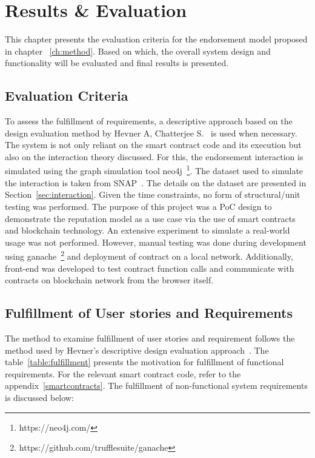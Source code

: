 \chapter{Results \& Evaluation} \label{ch:results}
This chapter presents the evaluation criteria for the endorsement model
proposed in chapter ~\ref{ch:method}. Based on which, the overall system design
and functionality will be evaluated and final results is presented. 

\section{Evaluation Criteria}
To assess the fulfillment of requirements, a descriptive approach based on the
design evaluation method by Hevner A, Chatterjee S.~\cite{hevner2010design} is
used when necessary. The system is not only reliant on the smart contract code
and its execution but also on the interaction theory discussed. For this, the
endorsement interaction is simulated using the graph simulation tool
neo4j~\footnote{https://neo4j.com/}. The dataset used to simulate the
interaction is taken from SNAP~\cite{snapnets}. The details on the dataset are
presented in Section~\ref{sec:interaction}. Given the time constraints, no form of
structural/unit testing was performed. The purpose of this project was a PoC
design to demonstrate the reputation model as a use case via the use of smart
contracts and blockchain technology. An extensive experiment to simulate a
real-world usage was not performed. However, manual testing was done during
development using ganache~\footnote{https://github.com/trufflesuite/ganache}
and deployment of contract on a local network. Additionally, front-end was
developed to test contract function calls and communicate with contracts on
blockchain network from the browser itself. 

\section{Fulfillment of User stories and Requirements}\label{fulfillment}
The method to examine fulfillment of user stories and requirement follows the
method used by Hevner's descriptive design evaluation
approach~\cite{hevner2010design}. The table~\ref{table:fulfillment} presents
the motivation for fulfillment of functional requirements. For the relevant
smart contract code, refer to the appendix~\ref{smartcontracts}. 
The fulfillment of non-functional system requirements is discussed below:

